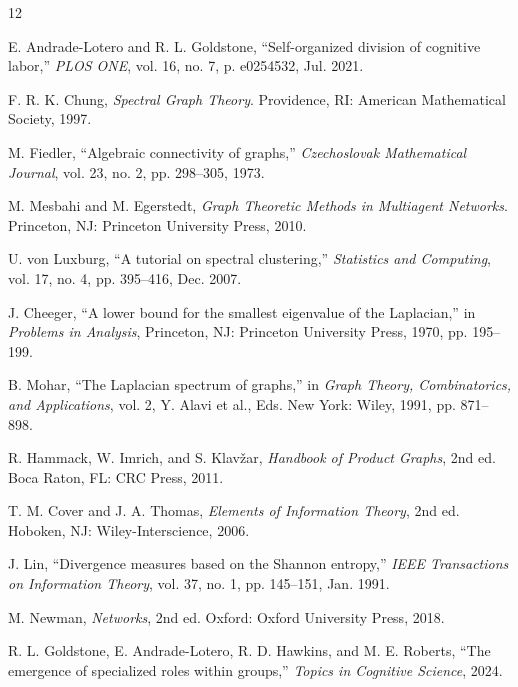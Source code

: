 \documentclass[conference]{IEEEtran}
\begin{document}

\begin{thebibliography}{12}

E. Andrade-Lotero and R. L. Goldstone, ``Self-organized division of cognitive labor,'' \textit{PLOS ONE}, vol. 16, no. 7, p. e0254532, Jul. 2021.

F. R. K. Chung, \textit{Spectral Graph Theory}. Providence, RI: American Mathematical Society, 1997.

M. Fiedler, ``Algebraic connectivity of graphs,'' \textit{Czechoslovak Mathematical Journal}, vol. 23, no. 2, pp. 298--305, 1973.

M. Mesbahi and M. Egerstedt, \textit{Graph Theoretic Methods in Multiagent Networks}. Princeton, NJ: Princeton University Press, 2010.

U. von Luxburg, ``A tutorial on spectral clustering,'' \textit{Statistics and Computing}, vol. 17, no. 4, pp. 395--416, Dec. 2007.

J. Cheeger, ``A lower bound for the smallest eigenvalue of the Laplacian,'' in \textit{Problems in Analysis}, Princeton, NJ: Princeton University Press, 1970, pp. 195--199.

B. Mohar, ``The Laplacian spectrum of graphs,'' in \textit{Graph Theory, Combinatorics, and Applications}, vol. 2, Y. Alavi et al., Eds. New York: Wiley, 1991, pp. 871--898.

R. Hammack, W. Imrich, and S. Klav\v{z}ar, \textit{Handbook of Product Graphs}, 2nd ed. Boca Raton, FL: CRC Press, 2011.

T. M. Cover and J. A. Thomas, \textit{Elements of Information Theory}, 2nd ed. Hoboken, NJ: Wiley-Interscience, 2006.

J. Lin, ``Divergence measures based on the Shannon entropy,'' \textit{IEEE Transactions on Information Theory}, vol. 37, no. 1, pp. 145--151, Jan. 1991.

M. Newman, \textit{Networks}, 2nd ed. Oxford: Oxford University Press, 2018.

R. L. Goldstone, E. Andrade-Lotero, R. D. Hawkins, and M. E. Roberts, ``The emergence of specialized roles within groups,'' \textit{Topics in Cognitive Science}, 2024.

\end{thebibliography}
\end{document}

